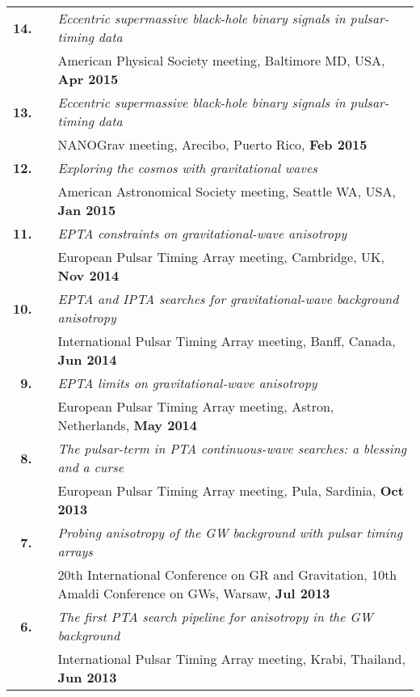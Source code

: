 \documentclass[11pt,letterpaper,sans]{moderncv}
\begin{document}
{\begin{longtable}{rp{0.3cm}p{15.8cm}}
\textbf{14.} & & \textit{Eccentric supermassive black-hole binary signals in pulsar-timing data} \\ 
&& American Physical Society meeting, Baltimore MD, USA, \textbf{Apr 2015} \vspace{0.09cm}\\
\textbf{13.} & & \textit{Eccentric supermassive black-hole binary signals in pulsar-timing data} \\ 
&& NANOGrav meeting, Arecibo, Puerto Rico, \textbf{Feb 2015} \vspace{0.09cm}\\
\textbf{12.} & & \textit{Exploring the cosmos with gravitational waves} \\ 
&& American Astronomical Society meeting, Seattle WA, USA, \textbf{Jan 2015} \vspace{0.09cm}\\
\textbf{11.} & & \textit{EPTA constraints on gravitational-wave anisotropy} \\ 
&& European Pulsar Timing Array meeting, Cambridge, UK, \textbf{Nov 2014} \vspace{0.09cm}\\
\textbf{10.} & & \textit{EPTA and IPTA searches for gravitational-wave background anisotropy} \\ 
&& International Pulsar Timing Array meeting, Banff, Canada, \textbf{Jun 2014} \vspace{0.09cm}\\
\textbf{9.} & & \textit{EPTA limits on gravitational-wave anisotropy} \\ 
&& European Pulsar Timing Array meeting, Astron, Netherlands, \textbf{May 2014} \vspace{0.09cm}\\
\textbf{8.} & & \textit{The pulsar-term in PTA continuous-wave searches: a blessing and a curse} \\ 
&& European Pulsar Timing Array meeting, Pula, Sardinia, \textbf{Oct 2013} \vspace{0.09cm}\\
\textbf{7.} & & \textit{Probing anisotropy of the GW background with pulsar timing arrays} \\ 
&& 20th International Conference on GR and Gravitation, 10th Amaldi Conference on GWs, Warsaw, \textbf{Jul 2013} \vspace{0.09cm}\\
\textbf{6.} & & \textit{The first PTA search pipeline for anisotropy in the GW background} \\ 
&& International Pulsar Timing Array meeting, Krabi, Thailand, \textbf{Jun 2013} \vspace{0.09cm}\\

\end{longtable}}
\end{document}
